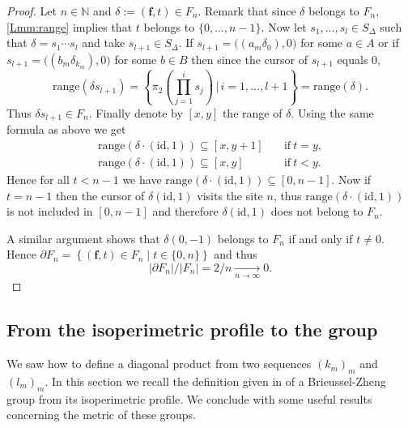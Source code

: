 \documentclass[english, 11pt, a4paper]{article}
\theoremstyle{definition}
\numberwithin{equation}{section}
\newcommand{\bN}{\mathbb{N}}
\newcommand{\mbff}{\boldsymbol{f}}
\newcommand{\BZ}{\Delta}
\newcommand{\range}{\mathrm{range}}
\begin{document}
\begin{proof}
  Let $n\in \bN$ and $\delta:=(\mbff,t)\in F_n$. Remark that since
  $\delta$ belongs to $ F_n$, \cref{Lmm:range} implies that $t$ belongs to $\{0,\ldots,n-1\}$. Now let
  $s_1,\ldots,s_l \in S_{\BZ}$ such
  that $\delta=s_1\cdots s_l$ and take $s_{l+1}\in S_{\BZ}$. If
  $s_{l+1}=\big((a_m\delta_0),0 \big)$ for some $a \in A$ or if
  $s_{l+1}=\big((b_m\delta_{k_m}),0 \big)$ for some $b\in B$ then
  since the cursor of $s_{l+1}$ equals $0$,
  \begin{equation*}
   \range (\delta s_{l+1}) =\left\{\pi_2\left(\prod^{i}_{j=1}s_j \right) \,
      | \, i=1,\ldots,l+1 \right\} = \range(\delta).
  \end{equation*}
  Thus $\delta s_{l+1}\in F_n$.
  Finally denote by $[x,y]$ the range of $\delta$. Using the same formula
  as above we get
  \begin{align*}
   \range (\delta\cdot (\mathrm{id},1))\subseteq [x,y+1] &\quad \text{if} \ t=y,\\
   \range (\delta\cdot (\mathrm{id},1))\subseteq [x,y] &\quad \text{if} \ t<y.
  \end{align*}
  Hence for all $t<n-1$ we have $\range(\delta\cdot (\mathrm{id},1)) \subseteq
  [0,n-1]$. Now if $t=n-1$ then the cursor of $\delta
  (\mathrm{id},1)$ visits the site $n$, thus $\range(\delta\cdot
  (\mathrm{id},1))$ is not included in $[0,n-1]$ and therefore
  $\delta(\mathrm{id},1)$ does not belong to $F_n$. 

  A similar argument shows that $\delta(0,-1)$ belongs to $F_n$ if and only if
  $t \neq 0$. 
  Hence $\partial F_n= \left\{\left(\mbff , t \right)\in F_n \mid
    t\in \{0,n\} \right\}$ and thus
  \begin{equation*}
    {\left\vert \partial F_n \right\vert}/{\left\vert F_n \right\vert}=
    {2}/{n} \underset{n \rightarrow \infty}{\longrightarrow} 0.
  \end{equation*}
\end{proof}
\subsection{From the isoperimetric profile to the
  group}\label{Subsec:FromIPtoBZ}
We saw how to define a diagonal product from two sequences $(k_m)_m$ and
$(l_m)_m$. In this section we recall the definition given in \cite[Appendice
B]{BZ} of a Brieussel-Zheng group from its isoperimetric profile. 
We conclude with some useful results concerning the metric of these groups.
 
\end{document}
